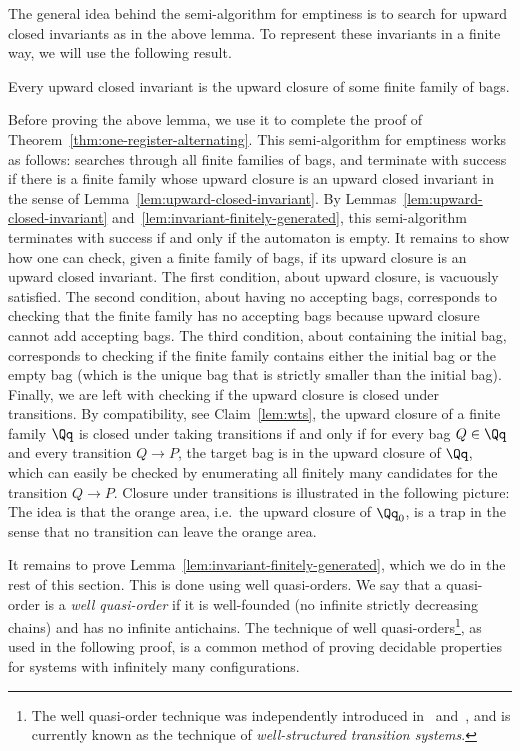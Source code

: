 The general idea behind the semi-algorithm for emptiness is to search for upward closed invariants as in the above lemma. To represent these invariants in a finite way, we will use the following result. 
\begin{lemma}\label{lem:invariant-finitely-generated}
	Every upward closed invariant is the upward closure of some finite family of bags.
\end{lemma}

Before proving the above lemma, we use it to complete the proof of Theorem~\ref{thm:one-register-alternating}. This semi-algorithm for emptiness works as follows: searches through all finite families of bags, and terminate with success if there is a finite family whose upward closure is an upward closed invariant in the sense of Lemma~\ref{lem:upward-closed-invariant}. By Lemmas~\ref{lem:upward-closed-invariant} and~\ref{lem:invariant-finitely-generated}, this semi-algorithm terminates with success if and only if the automaton is empty. It remains to show how one can check, given a finite family of bags, if its upward closure is an upward closed invariant. The first condition, about upward closure, is vacuously satisfied. The second condition, about having no accepting bags, corresponds to checking that the finite family has no accepting bags because upward closure cannot add accepting bags. The third condition, about containing the initial bag, corresponds to checking if the finite family contains either the initial bag or the empty bag (which is the unique bag that is strictly smaller than the initial bag). Finally, we are left with checking if the upward closure is closed under transitions. By compatibility, see Claim~\ref{lem:wts}, the upward closure of a finite family $\Qq$ is closed under taking transitions if and only if for every bag $Q \in \Qq$ and every transition $Q \to P$, the target bag is in the upward closure of $\Qq$, which can easily be checked by enumerating all finitely many candidates for the transition $Q \to P$. Closure under transitions is illustrated in the following picture:  
The idea is that the orange area, i.e.~the upward closure of $\Qq_0$, is a trap in the sense that no transition can leave the orange area.

It remains to prove Lemma~\ref{lem:invariant-finitely-generated}, which we do in the rest of this section. This is done using well quasi-orders. We say that a quasi-order is a \emph{well quasi-order} if it is well-founded (no infinite strictly decreasing chains) and has no infinite antichains. The technique of well quasi-orders\footnote{The well quasi-order technique was independently introduced in~\cite{DBLP:journals/iandc/AbdullaCJT00} and~\cite{DBLP:journals/tcs/FinkelS01}, and is currently known as the technique of \emph{well-structured transition systems}.}, as used in the following proof, is a common method of proving decidable properties for systems with infinitely many configurations.
 
